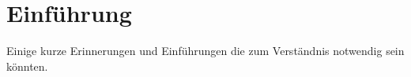 \chapter{Einführung} 
Einige kurze Erinnerungen und Einführungen die zum Verständnis notwendig sein könnten.
	